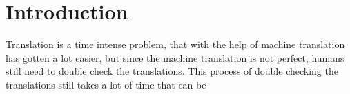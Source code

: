 
\chapter{Introduction}
\label{ch:Introduction}

Translation is a time intense problem, that with the help of machine translation has gotten a lot easier, but since the machine translation is not perfect, humans still need to double check the translations. This process of double checking the translations still takes a lot of time that can be 